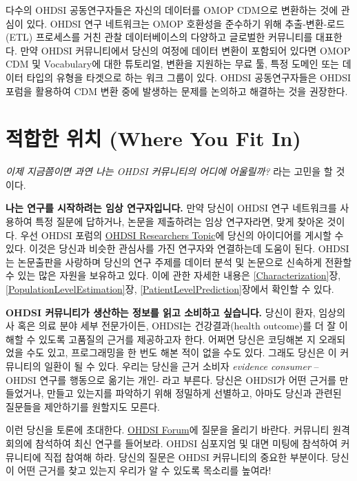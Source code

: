 \documentclass[11pt]{book}
\theoremstyle{definition}
\theoremstyle{definition}
\theoremstyle{definition}
\theoremstyle{remark}
\begin{document}
다수의 OHDSI 공동연구자들은 자신의 데이터를 OMOP CDM으로 변환하는 것에
관심이 있다. OHDSI 연구 네트워크는 OMOP 호환성을 준수하기 위해
추출-변환-로드(ETL) 프로세스를 거친 관찰 데이터베이스의 다양하고
글로벌한 커뮤니티를 대표한다. 만약 OHDSI 커뮤니티에서 당신의 여정에
데이터 변환이 포함되어 있다면 OMOP CDM 및 Vocabulary에 대한 튜토리얼,
변환을 지원하는 무료 툴, 특정 도메인 또는 데이터 타입의 유형을 타겟으로
하는 워크 그룹이 있다. OHDSI 공동연구자들은 OHDSI 포럼을 활용하여 CDM
변환 중에 발생하는 문제를 논의하고 해결하는 것을 권장한다.

\section{적합한 위치 (Where You Fit In)}\label{--where-you-fit-in}

\emph{이제 지금쯤이면 과연 나는 OHDSI 커뮤니티의 어디에 어울릴까?} 라는
고민을 할 것이다.

\textbf{나는 연구를 시작하려는 임상 연구자입니다.} 만약 당신이 OHDSI
연구 네트워크를 사용하여 특정 질문에 답하거나, 논문을 제출하려는 임상
연구자라면, 맞게 찾아온 것이다. 우선 OHDSI 포럼의
\href{https://forums.ohdsi.org/c/researchers}{OHDSI Researchers Topic}에
당신의 아이디어를 게시할 수 있다. 이것은 당신과 비슷한 관심사를 가진
연구자와 연결하는데 도움이 된다. OHDSI는 논문출판을 사랑하며 당신의 연구
주제를 데이터 분석 및 논문으로 신속하게 전환할 수 있는 많은 자원을
보유하고 있다. 이에 관한 자세한 내용은 \ref{Characterization}장,
\ref{PopulationLevelEstimation}장, \ref{PatientLevelPrediction}장에서
확인할 수 있다.

\textbf{OHDSI 커뮤니티가 생산하는 정보를 읽고 소비하고 싶습니다.} 당신이
환자, 임상의사 혹은 의료 분야 세부 전문가이든, OHDSI는 건강결과(health
outcome)를 더 잘 이해할 수 있도록 고품질의 근거를 제공하고자 한다.
어쩌면 당신은 코딩해본 지 오래되었을 수도 있고, 프로그래밍을 한 번도
해본 적이 없을 수도 있다. 그래도 당신은 이 커뮤니티의 일환이 될 수 있다.
우리는 당신을 근거 소비자 \emph{evidence consumer} -- OHDSI 연구를
행동으로 옮기는 개인- 라고 부른다. 당신은 OHDSI가 어떤 근거를
만들었거나, 만들고 있는지를 파악하기 위해 정밀하게 선별하고, 아마도
당신과 관련된 질문들을 제안하기를 원할지도 모른다.

이런 당신을 토론에 초대한다. \href{http://forum.ohdsi.org}{OHDSI
Forum}에 질문을 올리기 바란다. 커뮤니티 원격회의에 참석하여 최신 연구를
들어보라. OHDSI 심포지엄 및 대면 미팅에 참석하여 커뮤니티에 직접 참여해
하라. 당신의 질문은 OHDSI 커뮤니티의 중요한 부분이다. 당신이 어떤 근거를
찾고 있는지 우리가 알 수 있도록 목소리를 높여라!
\end{document}
